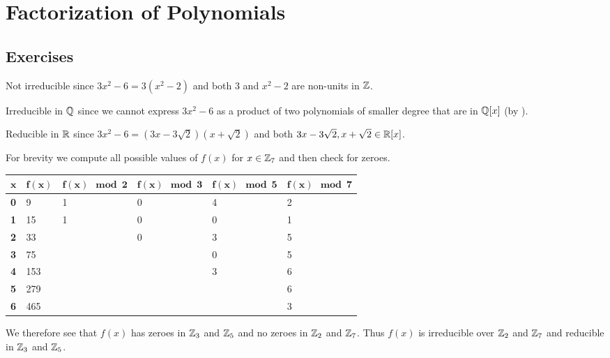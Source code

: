 \section{Factorization of Polynomials}
\subsection*{Exercises}
\begin{questions}
    \item \begin{partquestions}{\alph*}
        \item Not irreducible since $3x^2 - 6 = 3(x^2-2)$ and both 3 and $x^2-2$ are non-units in $\mathbb{Z}$.
        \item Irreducible in $\mathbb{Q}$ since we cannot express $3x^2-6$ as a product of two polynomials of smaller degree that are in $\mathbb{Q}[x]$ (by ).
        \item Reducible in $\mathbb{R}$ since $3x^2 - 6 = (3x-3\sqrt2)(x+\sqrt2)$ and both $3x-3\sqrt2, x+\sqrt2 \in \mathbb{R}[x]$.
    \end{partquestions}

    \item For brevity we compute all possible values of $f(x)$ for $x \in \mathbb{Z}_7$ and then check for zeroes.
    \begin{table}[H]
        \centering
        \begin{tabular}{|l|l|l|l|l|l|}
            \hline
            $\boldsymbol{x}$ & $\boldsymbol{f(x)}$ & $\boldsymbol{f(x) \mod2}$ & $\boldsymbol{f(x) \mod3}$ & $\boldsymbol{f(x) \mod5}$ & $\boldsymbol{f(x) \mod7}$ \\ \hline
            \textbf{0} & 9 & 1 & 0 & 4 & 2 \\ \hline
            \textbf{1} & 15 & 1 & 0 & 0 & 1 \\ \hline
            \textbf{2} & 33 &  & 0 & 3 & 5 \\ \hline
            \textbf{3} & 75 &  &  & 0 & 5 \\ \hline
            \textbf{4} & 153 &  &  & 3 & 6 \\ \hline
            \textbf{5} & 279 &  &  &  & 6 \\ \hline
            \textbf{6} & 465 &  &  &  & 3 \\ \hline
        \end{tabular}
    \end{table}
    We therefore see that $f(x)$ has zeroes in $\mathbb{Z}_3$ and $\mathbb{Z}_5$ and no zeroes in $\mathbb{Z}_2$ and $\mathbb{Z}_7$. Thus $f(x)$ is irreducible over $\mathbb{Z}_2$ and $\mathbb{Z}_7$ and reducible in $\mathbb{Z}_3$ and $\mathbb{Z}_5$.


\end{questions}
